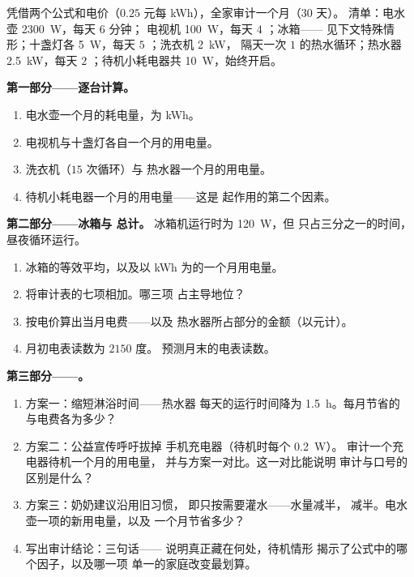 \begin{problem}\label{pb:g9:electric-power-energy:1}
凭借两个公式和电价（$0.25$ 元每
\unit{kWh}），全家审计一个月（30 天）。
清单：电水壶 \qty{2300}{W}，每天 $6$ 分钟；
电视机 \qty{100}{W}，每天 $4$ ；冰箱——
见下文特殊情形；十盏灯各 \qty{5}{W}，每天
$5$ ；洗衣机 \qty{2}{kW}，
隔天一次 $1$ 的热水循环；热水器 \qty{2.5}{kW}，每天
$2$ ；待机小耗电器共 \qty{10}{W}，始终开启。

\medskip\noindent\textbf{第一部分——逐台计算。}
\begin{enumerate}
  \item 电水壶一个月的耗电量，为 \unit{kWh}。
  \item 电视机与十盏灯各自一个月的用电量。
  \item 洗衣机（$15$ 次循环）与
        热水器一个月的用电量。
  \item 待机小耗电器一个月的用电量——这是
        起作用的第二个因素。
\end{enumerate}

\medskip\noindent\textbf{第二部分——冰箱与
总计。}
冰箱机运行时为 \qty{120}{W}，但
只占三分之一的时间，昼夜循环运行。
\begin{enumerate}[resume]
  \item 冰箱的等效平均，以及以
        \unit{kWh} 为的一个月用电量。
  \item 将审计表的七项相加。哪三项
        占主导地位？
  \item 按电价算出当月电费——以及
        热水器所占部分的金额（以元计）。
  \item 月初电表读数为 $2150$ 度。
        预测月末的电表读数。
\end{enumerate}

\medskip\noindent\textbf{第三部分——。}
\begin{enumerate}[resume]
  \item 方案一：缩短淋浴时间——热水器
        每天的运行时间降为 \qty{1.5}{h}。每月节省的
        与电费各为多少？
  \item 方案二：公益宣传呼吁拔掉
        手机充电器（待机时每个 \qty{0.2}{W}）。
        审计一个充电器待机一个月的用电量，
        并与方案一对比。这一对比能说明
        审计与口号的区别是什么？
  \item 方案三：奶奶建议沿用旧习惯，
        即只按需要灌水——水量减半，
        减半。电水壶一项的新用电量，以及
        一个月节省多少？
  \item 写出审计结论：三句话——
        说明真正藏在何处，待机情形
        揭示了公式中的哪个因子，以及哪一项
        单一的家庭改变最划算。
\end{enumerate}
\end{problem}

